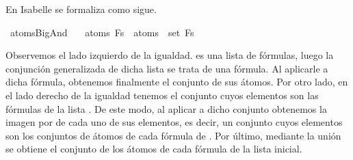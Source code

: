 \begin{isabellebody}
\begin{isamarkuptext}
  En Isabelle se formaliza como sigue.%
\end{isamarkuptext}\isamarkuptrue%
\isamarkupfalse%
\ atoms{\isacharunderscore}BigAnd{\isacharcolon}\ \isanewline
\ \ {\isachardoublequoteopen}atoms\ {\isacharparenleft}\isactrlbold {\isasymAnd}Fs{\isacharparenright}\ {\isacharequal}\ {\isasymUnion}{\isacharparenleft}atoms\ {\isacharbackquote}\ set\ Fs{\isacharparenright}{\isachardoublequoteclose}\isanewline
%
\isadelimproof
\ \ %
\endisadelimproof
%
\isatagproof
{}\isamarkupfalse%
%
\endisatagproof
{\isafoldproof}%
%
\isadelimproof
%
\endisadelimproof
%
\begin{isamarkuptext}%
Observemos el lado izquierdo de la igualdad.  es una 
  lista de fórmulas, luego la conjunción generalizada de dicha lista se 
  trata de una fórmula. Al aplicarle  a dicha fórmula, obtenemos 
  finalmente el conjunto de sus átomos. Por otro lado, en el lado 
  derecho de la igualdad tenemos el conjunto  cuyos elementos 
  son las fórmulas de la lista . De este modo, al aplicar  
  a dicho conjunto obtenemos la imagen por  de cada uno de sus
  elementos, es decir, un conjunto cuyos elementos son los 
  conjuntos de átomos de cada fórmula de . Por último, mediante la 
  unión se obtiene el conjunto de los átomos de cada fórmula de la 
  lista inicial.


\end{isamarkuptext}
\end{isabellebody}
